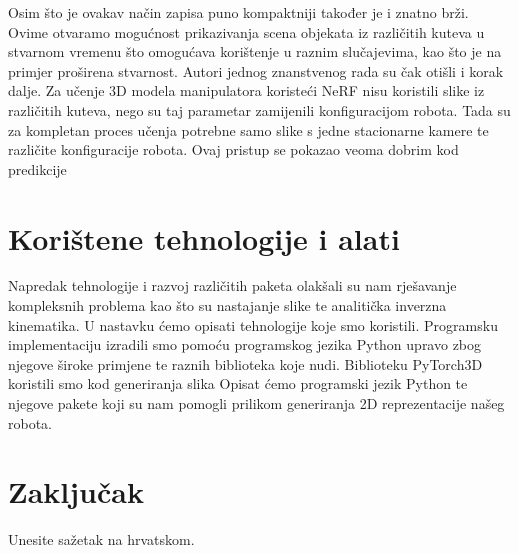 \documentclass[times, utf8, diplomskirad]{fer}
\begin{document}
Osim što je ovakav način zapisa puno kompaktniji također je i znatno brži.
Ovime otvaramo mogućnost prikazivanja scena objekata iz različitih kuteva u stvarnom vremenu što omogućava korištenje u raznim slučajevima, kao što je na primjer proširena stvarnost.
Autori jednog znanstvenog rada\cite{nerfSelfModelling} su čak otišli i korak dalje.
Za učenje 3D modela manipulatora koristeći NeRF nisu koristili slike iz različitih kuteva, nego su taj parametar zamijenili konfiguracijom robota.
Tada su za kompletan proces učenja potrebne samo slike s jedne stacionarne kamere te različite konfiguracije robota.
Ovaj pristup se pokazao veoma dobrim kod predikcije

\chapter{Korištene tehnologije i alati}
Napredak tehnologije i razvoj različitih paketa olakšali su nam rješavanje kompleksnih problema kao što su nastajanje slike te analitička inverzna kinematika.
U nastavku ćemo opisati tehnologije koje smo koristili.
Programsku implementaciju izradili smo pomoću programskog jezika Python upravo zbog njegove široke primjene te raznih biblioteka koje nudi.
Biblioteku PyTorch3D koristili smo kod generiranja slika
Opisat ćemo programski jezik Python te njegove pakete koji su nam pomogli prilikom generiranja 2D reprezentacije našeg robota.

\chapter{Zaključak}
\label{pog:zakljucak}









\begin{sazetak}
  Unesite sažetak na hrvatskom.

  \blindtext
\end{sazetak}
\end{document}
